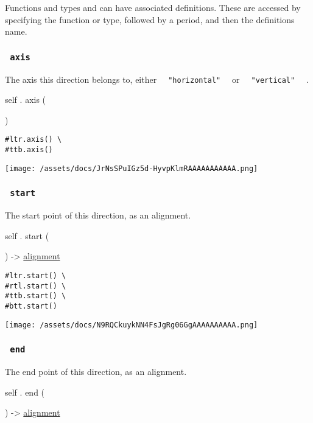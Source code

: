 \label{definitions-tooltip}
Functions and types and can have associated definitions. These are
accessed by specifying the function or type, followed by a period, and
then the definition\textquotesingle s name.

\subsubsection{\texorpdfstring{\texttt{\ axis\ }}{ axis }}\label{definitions-axis}

The axis this direction belongs to, either
\texttt{\ }{\texttt{\ "horizontal"\ }}\texttt{\ } or
\texttt{\ }{\texttt{\ "vertical"\ }}\texttt{\ } .

self { . } { axis } (

)

\begin{verbatim}
#ltr.axis() \
#ttb.axis()
\end{verbatim}

\texttt{[image: /assets/docs/JrNsSPuIGz5d-HyvpKlmRAAAAAAAAAAA.png]}

\subsubsection{\texorpdfstring{\texttt{\ start\ }}{ start }}\label{definitions-start}

The start point of this direction, as an alignment.

self { . } { start } (

) -\textgreater{} \href{/docs/reference/layout/alignment/}{alignment}

\begin{verbatim}
#ltr.start() \
#rtl.start() \
#ttb.start() \
#btt.start()
\end{verbatim}

\texttt{[image: /assets/docs/N9RQCkuykNN4FsJgRg06GgAAAAAAAAAA.png]}

\subsubsection{\texorpdfstring{\texttt{\ end\ }}{ end }}\label{definitions-end}

The end point of this direction, as an alignment.

self { . } { end } (

) -\textgreater{} \href{/docs/reference/layout/alignment/}{alignment}

